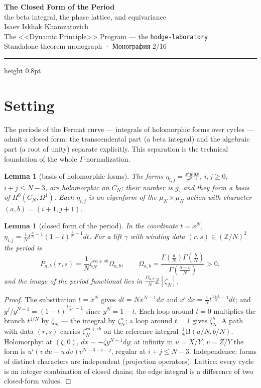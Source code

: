 \documentclass[11pt,a4paper]{article}
\theoremstyle{plain}
\newtheorem{lemma}[theorem]{Lemma}
\theoremstyle{definition}
\theoremstyle{remark}
\newcommand{\ZZ}{\mathbb{Z}}
\newcommand{\Ga}{\Gamma}
\newcommand{\Bfun}{\mathrm{B}}
\begin{document}
\begin{center}
{\LARGE\bfseries The Closed Form of the Period}\\[0.4em]
{\large the beta integral, the phase lattice, and equivariance}\\[0.6em]
{\normalsize Isaev Iskhak Khamzatovich}\\[0.2em]
{\normalsize The <<Dynamic Principle>> Program --- the \texttt{hodge-laboratory}}\\[0.15em]
{\small Standalone theorem monograph · Монография 2/16}
\end{center}
\vspace{0.4em}
{\color{linkblue}\hrule height 0.8pt}
\vspace{0.8em}

\section{Setting}

The periods of the Fermat curve --- integrals of holomorphic forms
over cycles --- admit a closed form: the transcendental part (a beta
integral) and the algebraic part (a root of unity) separate
explicitly. This separation is the technical foundation of the
whole $\Ga$-normalization.

\begin{lemma}[basis of holomorphic forms]\label{lem:forms}
The forms $\eta_{i,j}=\frac{x^i y^j dx}{y^{N-1}}$,
$i,j\ge0$, $i+j\le N-3$, are holomorphic on $C_N$; their number is
$g$, and they form a basis of $H^0(C_N,\Omega^1)$. Each
$\eta_{i,j}$ is an eigenform of the $\mu_N\times\mu_N$-action with
character $(a,b)=(i+1,j+1)$.
\end{lemma}

\begin{lemma}[closed form of the period]\label{lem:closedform}
In the coordinate $t=x^N$,
$\eta_{i,j}=\frac1N t^{\frac aN-1}(1-t)^{\frac bN-1}dt$. For a lift
$\gamma$ with winding data $(r,s)\in(\ZZ/N)^2$ the period is
\[
  P_{a,b}(r,s)=\frac1N\zeta_N^{ra+sb}\Omega_{a,b},
  \qquad
  \Omega_{a,b}=\frac{\Ga(\frac aN)\Ga(\frac bN)}{\Ga(\frac{a+b}N)}>0,
\]
and the image of the period functional lies in
$\frac{\Omega_{a,b}}{N}\ZZ[\zeta_N]$.
\end{lemma}

\begin{proof}
The substitution $t=x^N$ gives $dt=Nx^{N-1}dx$ and
$x^i\,dx=\tfrac1Nt^{\frac{i+1}N-1}dt$; and
$y^j/y^{N-1}=(1-t)^{\frac{j+1}N-1}$ since $y^N=1-t$. Each loop
around $t=0$ multiplies the branch $t^{1/N}$ by $\zeta_N$ --- the
integral by $\zeta_N^a$; a loop around $t=1$ gives $\zeta_N^b$. A
path with data $(r,s)$ carries $\zeta_N^{ra+sb}$ on the reference
integral $\frac1N\Bfun(a/N,b/N)$. Holomorphy: at $(\zeta,0)$,
$dx\sim-\zeta y^{N-1}dy$; at infinity in $u=X/Y$, $v=Z/Y$ the form
is $u^i(v\,du-u\,dv)v^{N-3-i-j}$, regular at $i+j\le N-3$.
Independence: forms of distinct characters are independent
(projection operators). Lattice: every cycle is an integer
combination of closed chains; the edge integral is a difference of
two closed-form values.
\end{proof}
\end{document}
